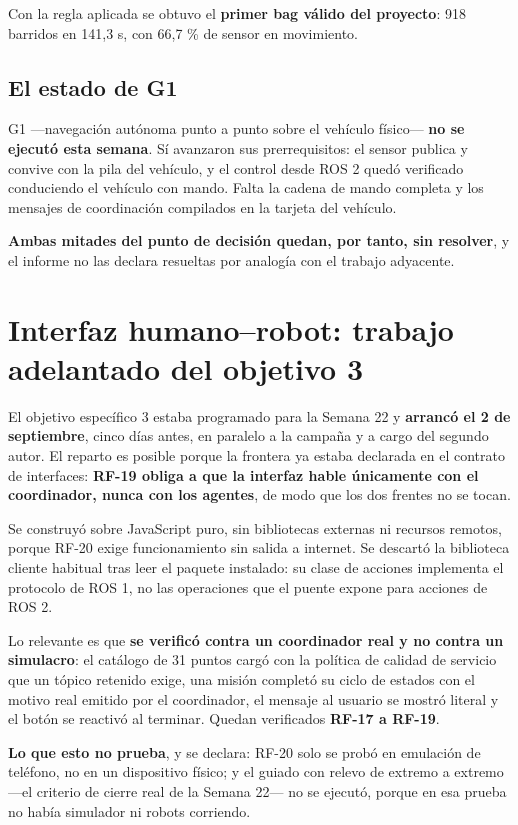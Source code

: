 \documentclass[12pt,letterpaper]{article}
\begin{document}
Con la regla aplicada se obtuvo el \textbf{primer bag válido del proyecto}: 918 barridos en 141,3 s, con 66,7 \% de sensor en movimiento.

\subsection{El estado de G1}

G1 ---navegación autónoma punto a punto sobre el vehículo físico--- \textbf{no se ejecutó esta semana}. Sí avanzaron sus prerrequisitos: el sensor publica y convive con la pila del vehículo, y el control desde ROS 2 quedó verificado conduciendo el vehículo con mando. Falta la cadena de mando completa y los mensajes de coordinación compilados en la tarjeta del vehículo.

\textbf{Ambas mitades del punto de decisión quedan, por tanto, sin resolver}, y el informe no las declara resueltas por analogía con el trabajo adyacente.

\section{Interfaz humano--robot: trabajo adelantado del objetivo 3}

El objetivo específico 3 estaba programado para la Semana 22 y \textbf{arrancó el 2 de septiembre}, cinco días antes, en paralelo a la campaña y a cargo del segundo autor. El reparto es posible porque la frontera ya estaba declarada en el contrato de interfaces: \textbf{RF-19 obliga a que la interfaz hable únicamente con el coordinador, nunca con los agentes}, de modo que los dos frentes no se tocan.

Se construyó sobre JavaScript puro, sin bibliotecas externas ni recursos remotos, porque RF-20 exige funcionamiento sin salida a internet. Se descartó la biblioteca cliente habitual tras leer el paquete instalado: su clase de acciones implementa el protocolo de ROS 1, no las operaciones que el puente expone para acciones de ROS 2.

Lo relevante es que \textbf{se verificó contra un coordinador real y no contra un simulacro}: el catálogo de 31 puntos cargó con la política de calidad de servicio que un tópico retenido exige, una misión completó su ciclo de estados con el motivo real emitido por el coordinador, el mensaje al usuario se mostró literal y el botón se reactivó al terminar. Quedan verificados \textbf{RF-17 a RF-19}.

\textbf{Lo que esto no prueba}, y se declara: RF-20 solo se probó en emulación de teléfono, no en un dispositivo físico; y el guiado con relevo de extremo a extremo ---el criterio de cierre real de la Semana 22--- no se ejecutó, porque en esa prueba no había simulador ni robots corriendo.
\end{document}
